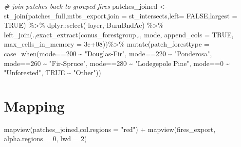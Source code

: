 \documentclass[
]{book}
\newenvironment{Shaded}{\begin{snugshade}}{\end{snugshade}}
\newcommand{\AttributeTok}[1]{\textcolor[rgb]{0.77,0.63,0.00}{#1}}
\newcommand{\CommentTok}[1]{\textcolor[rgb]{0.56,0.35,0.01}{\textit{#1}}}
\newcommand{\ConstantTok}[1]{\textcolor[rgb]{0.00,0.00,0.00}{#1}}
\newcommand{\DecValTok}[1]{\textcolor[rgb]{0.00,0.00,0.81}{#1}}
\newcommand{\FloatTok}[1]{\textcolor[rgb]{0.00,0.00,0.81}{#1}}
\newcommand{\FunctionTok}[1]{\textcolor[rgb]{0.00,0.00,0.00}{#1}}
\newcommand{\NormalTok}[1]{#1}
\newcommand{\OtherTok}[1]{\textcolor[rgb]{0.56,0.35,0.01}{#1}}
\newcommand{\SpecialCharTok}[1]{\textcolor[rgb]{0.00,0.00,0.00}{#1}}
\newcommand{\StringTok}[1]{\textcolor[rgb]{0.31,0.60,0.02}{#1}}
\begin{document}
\begin{Shaded}
\begin{Highlighting}[]
\CommentTok{\# join patches back to grouped fires}
\NormalTok{patches\_joined }\OtherTok{\textless{}{-}} \FunctionTok{st\_join}\NormalTok{(patches\_full,mtbs\_export,}\AttributeTok{join =}\NormalTok{ st\_intersects,}\AttributeTok{left=} \ConstantTok{FALSE}\NormalTok{,}\AttributeTok{largest =} \ConstantTok{TRUE}\NormalTok{) }\SpecialCharTok{\%\textgreater{}\%}
\NormalTok{  dplyr}\SpecialCharTok{::}\FunctionTok{select}\NormalTok{(}\SpecialCharTok{{-}}\NormalTok{layer,}\SpecialCharTok{{-}}\NormalTok{BurnBndAc) }\SpecialCharTok{\%\textgreater{}\%} 
  \FunctionTok{left\_join}\NormalTok{(.,}\FunctionTok{exact\_extract}\NormalTok{(conus\_forestgroup,., }\StringTok{\textquotesingle{}mode\textquotesingle{}}\NormalTok{, }\AttributeTok{append\_cols =} \ConstantTok{TRUE}\NormalTok{, }\AttributeTok{max\_cells\_in\_memory =} \FloatTok{3e+08}\NormalTok{))}\SpecialCharTok{\%\textgreater{}\%}
  \FunctionTok{mutate}\NormalTok{(}\AttributeTok{patch\_foresttype =} \FunctionTok{case\_when}\NormalTok{(mode}\SpecialCharTok{==}\DecValTok{200} \SpecialCharTok{\textasciitilde{}} \StringTok{"Douglas{-}Fir"}\NormalTok{,}
\NormalTok{                                     mode}\SpecialCharTok{==}\DecValTok{220} \SpecialCharTok{\textasciitilde{}} \StringTok{"Ponderosa"}\NormalTok{,}
\NormalTok{                                     mode}\SpecialCharTok{==}\DecValTok{260} \SpecialCharTok{\textasciitilde{}} \StringTok{"Fir{-}Spruce"}\NormalTok{,}
\NormalTok{                                     mode}\SpecialCharTok{==}\DecValTok{280} \SpecialCharTok{\textasciitilde{}} \StringTok{"Lodegepole Pine"}\NormalTok{,}
\NormalTok{                                     mode}\SpecialCharTok{==}\DecValTok{0} \SpecialCharTok{\textasciitilde{}} \StringTok{"Unforested"}\NormalTok{,}
                                     \ConstantTok{TRUE} \SpecialCharTok{\textasciitilde{}} \StringTok{"Other"}\NormalTok{))}
\end{Highlighting}
\end{Shaded}

\hypertarget{mapping-1}{%
\section{Mapping}\label{mapping-1}}

\begin{Shaded}
\begin{Highlighting}[]
\FunctionTok{mapview}\NormalTok{(patches\_joined,}\AttributeTok{col.regions =} \StringTok{"red"}\NormalTok{) }\SpecialCharTok{+} \FunctionTok{mapview}\NormalTok{(fires\_export, }\AttributeTok{alpha.regions =} \DecValTok{0}\NormalTok{, }\AttributeTok{lwd =} \DecValTok{2}\NormalTok{)}
\end{Highlighting}
\end{Shaded}
\end{document}
